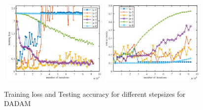 \documentclass[anon,12pt]{colt2021} %
\begin{document}
\begin{figure}[H]
    \begin{center}
\mbox{
	\includegraphics[width=0.45\textwidth]{figures/adam_train.eps}
    \includegraphics[width=0.45\textwidth]{figures/adam_test.eps}
	}
    \end{center}
\caption{Training loss and Testing accuracy for different stepsizes for DADAM}
	\label{fig: adam_curve}
\end{figure}

    
	
\end{document}

